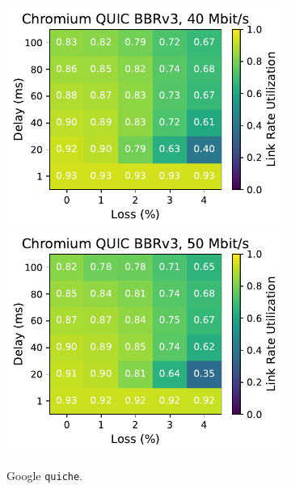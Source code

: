 \begin{figure}[ht]
\begin{subfigure}[b]{0.22\linewidth}
        \includegraphics[width=\linewidth,trim={0 0 2cm 0},clip]{splitting/figures/heatmaps/heatmap_quic_bbr3_40mbps.pdf}
        \includegraphics[width=\linewidth,trim={0 0 2cm 0},clip]{splitting/figures/heatmaps/heatmap_quic_bbr3_50mbps.pdf}
        \caption{Google \texttt{quiche}.}
    \end{subfigure}
    \begin{subfigure}[b]{0.22\linewidth}

\end{subfigure}
\end{figure}
